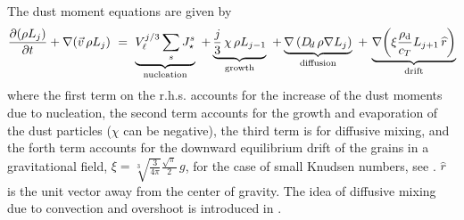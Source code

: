 \documentclass[11pt]{article}
\def\Vl{V_{\ell}}
\def\rhod{\rho_{\rm d}}
\def\pdiff#1#2{\frac{\partial #1}{\partial #2}}
\def\Dd{D_{\!d}}
\begin{document}
The dust moment equations are given by \citep[see derivation
  in][section~3]{Woitke2003}
\begin{equation}
  \pdiff{(\rho L_j)}{t} + \nabla(\vec{v}\,\rho L_j) 
    ~=~ \underbrace{\Vl^{j/3} \sum\limits_s J_\star^s}_{\rm nucleation}
    ~+\underbrace{\frac{j}{3}\,\chi\,\rho L_{j-1}}_{\rm growth}
    ~+\underbrace{\nabla\left(\Dd\,\rho\nabla L_j\right)}_{\rm diffusion}
    ~+\,\underbrace{\nabla\!\left(\xi\frac{\rhod}{c_T}L_{j+1}
                  \,\widehat{r}\right)}_{\rm drift}
\end{equation}
where the first term on the r.h.s. accounts for the increase of the
dust moments due to nucleation, the second term accounts for the
growth and evaporation of the dust particles ($\chi$ can be negative),
the third term is for diffusive mixing, and the forth term accounts
for the downward equilibrium drift of the grains in a gravitational
field, $\xi=\sqrt[3]{\frac{3}{4\pi}}\frac{\sqrt{\pi}}{2}\,g$, for the
case of small Knudsen numbers, see \citet[][section
  5.1]{Woitke2003}. $\widehat{r}$ is the unit vector away from the
center of gravity.  The idea of diffusive mixing due to convection and
overshoot is introduced in \citet[][Sect.~2.1 and, in
particular, Sect.~4.2]{Woitke2004}.
\end{document}
